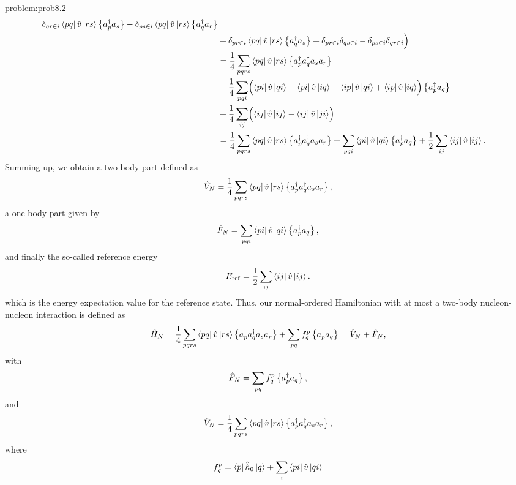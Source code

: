 \begin{sol}{problem:prob8.2}
\begin{align*}
      \delta_{qr \in i} \bra{pq}\hat{v}\ket{rs} \left\{a^\dagger_p
        a_s\right\} - \delta_{ps \in i}\bra{pq}\hat{v}\ket{rs}
      \left\{a^\dagger_q a_r\right\}\\ & + \delta_{pr \in i}
      \bra{pq}\hat{v}\ket{rs} \left\{a^\dagger_q a_s\right\}+ \delta_{pr
        \in i} \delta_{qs \in i}- \delta_{ps \in i} \delta_{qr \in i}
      \Bigr) \\ &= \frac{1}{4} \sum_{pqrs} \bra{pq}\hat{v}\ket{rs}
      \left\{a^\dagger_p a^\dagger_q a_s a_r\right\}\\ & + \frac{1}{4}
      \sum_{pqi} \Bigl(\bra{pi}\hat{v}\ket{qi} -
      \bra{pi}\hat{v}\ket{iq} - \bra{ip}\hat{v}\ket{qi} +
      \bra{ip}\hat{v}\ket{iq}\Bigr) \left\{a^\dagger_p a_q\right\}\\ & +
      \frac{1}{4} \sum_{ij} \Bigl(\bra{ij}\hat{v}\ket{ij}-
      \bra{ij}\hat{v}\ket{ji}\Bigr)\\ &= \frac{1}{4} \sum_{pqrs}
      \bra{pq}\hat{v}\ket{rs} \left\{a^\dagger_p a^\dagger_q a_s
        a_r\right\} + \sum_{pqi} \bra{pi}\hat{v}\ket{qi}
      \left\{a^\dagger_p a_q\right\} + \frac{1}{2} \sum_{ij}
      \bra{ij}\hat{v}\ket{ij}.
      \end{align*}
  Summing up, we obtain a two-body part defined as
      \begin{equation*}
              \hat{V}_N = \frac{1}{4} \sum_{pqrs}
              \bra{pq}\hat{v}\ket{rs} \left\{a^\dagger_p
                a^\dagger_q a_s a_r\right\},
      \end{equation*}
  a one-body part given by
      \begin{equation*}
              \hat{F}_N = \sum_{pqi} \bra{pi}\hat{v}\ket{qi}
              \left\{a^\dagger_p a_q\right\},
      \end{equation*}
      and finally the so-called reference energy
      \begin{equation*}
                  E_{\mathrm{ref}}= \frac{1}{2} \sum_{ij}
                  \bra{ij}\hat{v}\ket{ij}.
      \end{equation*}
  which is the energy expectation value for the reference state.
  Thus, our normal-ordered Hamiltonian with at most a two-body
  nucleon-nucleon interaction is defined as
  \[
  \hat{H}_N =\frac{1}{4} \sum_{pqrs} \bra{pq}\hat{v}\ket{rs}
  \left\{a^\dagger_p a^\dagger_q a_s a_r\right\} + \sum_{pq} f_q^p
  \left\{a^\dagger_p a_q\right\}= \hat{V}_N + \hat{F}_N,
  \]
  with
  \[
  \hat{F}_N = \sum_{pq} f_q^p \left\{a^\dagger_p a_q\right\},
  \]
  and
  \[
  \hat{V}_N = \frac{1}{4} \sum_{pqrs} \bra{pq}\hat{v}\ket{rs}
  \left\{a^\dagger_p a^\dagger_q a_s a_r\right\},
  \]
  where
  \[
    f_q^p = \bra{p}\hat{h}_0\ket{q} + \sum_i
    \bra{pi}\hat{v}\ket{qi}
  \]
  \end{sol}

